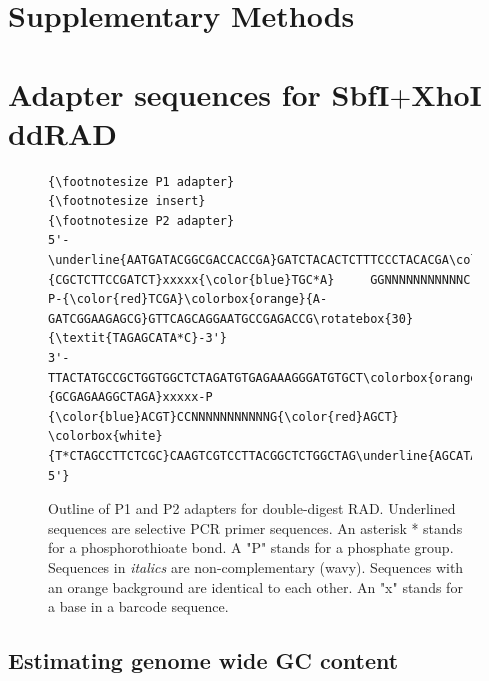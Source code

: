 \documentclass[a4paper,12pt,times,print,index, custombib]{PhDThesisPSnPDF}\usepackage[]{graphicx}\usepackage[]{color}
\begin{document}
\section{Supplementary Methods}

\section{Adapter sequences for SbfI$+$XhoI ddRAD}
\begin{figure}[h]
\begin{Verbatim}[fontfamily=courier, fontsize=\relsize{-7}, commandchars=\\\{\}, frame=single, framesep=10pt, label=P1 and P2 adapters for ddRAD]
          {\footnotesize P1 adapter}                                        {\footnotesize insert}                                   {\footnotesize P2 adapter}
5'-\underline{AATGATACGGCGACCACCGA}GATCTACACTCTTTCCCTACACGA\colorbox{white}{CGCTCTTCCGATCT}xxxxx{\color{blue}TGC*A}     GGNNNNNNNNNNNC     P-{\color{red}TCGA}\colorbox{orange}{A-GATCGGAAGAGCG}GTTCAGCAGGAATGCCGAGACCG\rotatebox{30}{\textit{TAGAGCATA*C}-3'}
3'-TTACTATGCCGCTGGTGGCTCTAGATGTGAGAAAGGGATGTGCT\colorbox{orange}{GCGAGAAGGCTAGA}xxxxx-P    {\color{blue}ACGT}CCNNNNNNNNNNNG{\color{red}AGCT}       \colorbox{white}{T*CTAGCCTTCTCGC}CAAGTCGTCCTTACGGCTCTGGCTAG\underline{AGCATACGGCAGAAGACGAAC-5'}
\end{Verbatim}
\caption{Outline of P1 and P2 adapters for double-digest RAD. Underlined sequences are selective PCR primer sequences. An asterisk * stands for a phosphorothioate bond. A "P" stands for a phosphate group. Sequences in \textit{italics} are non-complementary (wavy). Sequences with an orange background are identical to each other. An "x" stands for a base in a barcode sequence.}
\label{adapter-outline} %
\end{figure}


\FloatBarrier
\subsection{Estimating genome wide GC content}\label{ch:gc}
\end{document}
